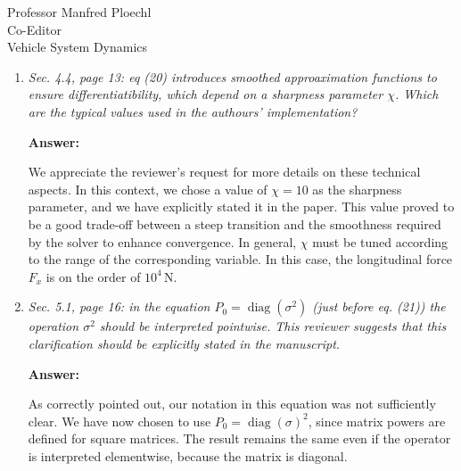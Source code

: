 \documentclass{letter}
\renewcommand\ul[1]{#1} %
\DeclareMathOperator{\diag}{diag}
\begin{document}
\begin{letter}{Professor Manfred Ploechl\\
Co-Editor\\
Vehicle System Dynamics}
\begin{enumerate}
Within a direct-collocation + IPOPT pipeline, keeping $(x,y)$ as states and also adding $e$ as algebraic variable, yields Jacobians that are sparser and typically less involved algebraically: the track geometry (centerline curvature/banking and their derivatives) enters only the algebraic relation for $e$, rather than propagating through the full state dynamics at every collocation point. By contrast, promoting $e$ to a state in a track-embedded (Frenet-Serret type) model couples the dynamics to space-varying geometry terms, which tends to densify the KKT system and degrade conditioning. A further practical advantage is that many constraints and features (e.g., global track limits, obstacles, multi-vehicle interactions) are naturally expressed in inertial coordinates and remain simpler when $(x,y)$ are states.

\hrulefill

\item
\textit{Sec. 4.4, page 13: eq (20) introduces smoothed approaximation functions to ensure differentiatibility, which depend on a sharpness parameter $\chi$. Which are the typical values used in the authours' implementation?}

\vspace{2mm}

\textbf{Answer:}

We appreciate the reviewer's request \ul{for more details on these technical aspects.} In this context, we chose a value of $\chi=10$ as the sharpness parameter, and we have explicitly stated it in the paper. This value proved to be a good trade-off between a steep transition and the smoothness required by the solver to enhance convergence. In general, $\chi$ must be tuned according to the range of the corresponding variable. In this case, the longitudinal force $F_x$ is on the order of $10^4$\,N.

\hrulefill

\item
\textit{Sec. 5.1, page 16: in the equation $P_0=\diag(\sigma^2)$ (just before eq. (21)) the operation $\sigma^2$ should be interpreted pointwise. This reviewer suggests that this clarification should be explicitly stated in the manuscript.}

\vspace{2mm}

\textbf{Answer:}

As correctly pointed out, our notation in this equation was not sufficiently clear. We have now chosen to use $P_0=\diag(\sigma)^2$, since matrix powers are defined for square matrices. The result remains the same even if the operator is interpreted elementwise, because the matrix is diagonal.


\end{enumerate}
\end{letter}
\end{document}
